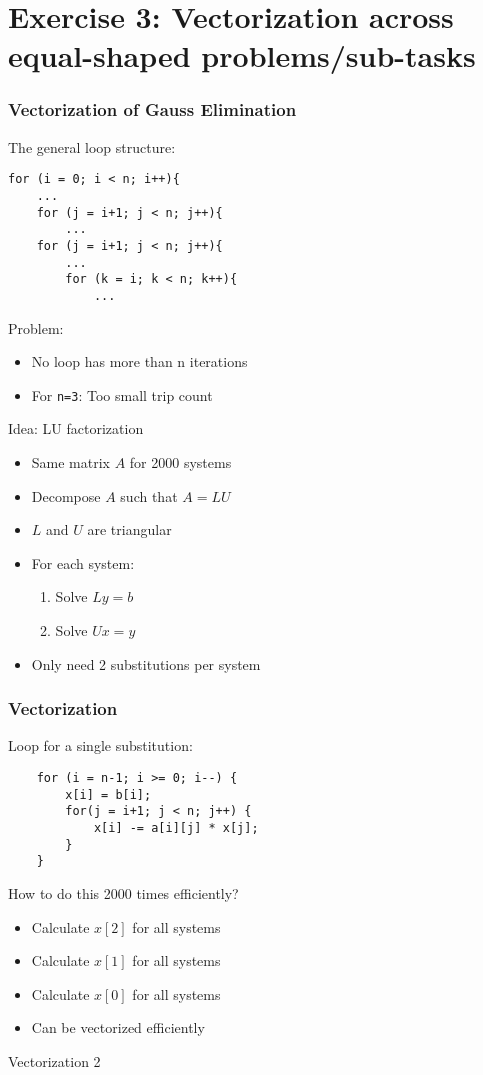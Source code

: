 \section{Exercise 3: Vectorization across equal-shaped problems/sub-tasks}
\begin{frame}[fragile]
\frametitle{Vectorization of Gauss Elimination}
The general loop structure:
\codestylec
\begin{lstlisting}
for (i = 0; i < n; i++){
    ...
    for (j = i+1; j < n; j++){
        ...
    for (j = i+1; j < n; j++){
        ...
        for (k = i; k < n; k++){
            ...                   
\end{lstlisting}
Problem:
\begin{itemize}
\item No loop has more than n iterations
\item For \texttt{n=3}: Too small trip count
\end{itemize}
\end{frame}

\begin{frame}{Idea: LU factorization}
\begin{itemize}
\item Same matrix $A$ for 2000 systems
\item Decompose $A$ such that $A = LU$
\item $L$ and $U$ are triangular
\break
\item For each system:
	\begin{enumerate}
	\item Solve $Ly = b$
	\item Solve $Ux = y$
	\end{enumerate}
\item Only need 2 substitutions per system
\end{itemize}
\end{frame}

\begin{frame}[fragile]
\frametitle{Vectorization}
Loop for a single substitution:
\codestylec
\begin{lstlisting}
    for (i = n-1; i >= 0; i--) {
        x[i] = b[i];
        for(j = i+1; j < n; j++) {
            x[i] -= a[i][j] * x[j];
        }
    }                  
\end{lstlisting}
How to do this 2000 times efficiently?
\begin{itemize}
\item Calculate $x[2]$ for all systems
\item Calculate $x[1]$ for all systems
\item Calculate $x[0]$ for all systems
\item Can be vectorized efficiently
\end{itemize}
\end{frame}

\begin{frame}{Vectorization 2}
\end{frame}
